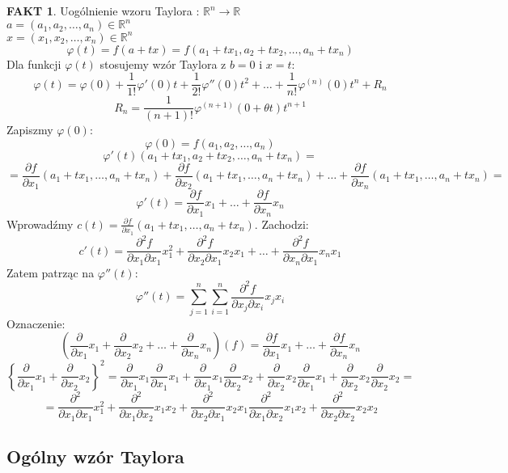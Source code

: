 \documentclass{article}
\theoremstyle{definition}
\theoremstyle{definition}
\theoremstyle{definition}
\theoremstyle{definition}
\theoremstyle{definition}
\theoremstyle{definition}
\theoremstyle{definition}
\newtheorem*{fakt}{FAKT}
\begin{document}
\begin{fakt}
Uogólnienie wzoru Taylora : $\mathbb{R}^n \rightarrow \mathbb{R}$\\
$a=(a_1,a_2,\dots,a_n)\in\mathbb{R}^n$\\ $x=(x_1,x_2,\dots, x_n)\in\mathbb{R}^n$
\[\varphi(t) = f(a+tx) = f(a_1+tx_1,a_2+tx_2,\dots,a_n+tx_n)\]
Dla funkcji $\varphi(t)$ stosujemy wzór Taylora z $b=0$ i $x=t$:
\[\varphi(t) = \varphi(0) + \frac{1}{1!} \varphi'(0)t + \frac{1}{2!} \varphi''(0)t^2 + \dots + \frac{1}{n!} \varphi^{(n)}(0) t^{n} + R_n\]
\[R_n = \frac{1}{(n+1)!} \varphi^{(n+1)} (0+\theta t) t^{n+1}\]
Zapiszmy $\varphi(0)$:
\[\varphi(0) = f(a_1,a_2,\dots, a_n)\]
\[\varphi'(t)(a_1+tx_1,a_2+tx_2,\dots,a_n+tx_n)=\]
\[=\frac{\partial f}{\partial x_1}(a_1+tx_1,\dots,a_n+tx_n) + \frac{\partial f}{\partial x_2}(a_1+tx_1,\dots,a_n+tx_n) + \dots + \frac{\partial f}{\partial x_n}(a_1+tx_1,\dots,a_n+tx_n)=\]
\[\varphi'(t) = \frac{\partial f}{\partial x_1} x_1 + \dots + \frac{\partial f}{\partial x_n} x_n\]
Wprowadźmy $c(t)=\frac{\partial f}{\partial x_1}(a_1+tx_1,\dots,a_n+tx_n)$. Zachodzi:
\[c'(t) = \frac{\partial^2 f}{\partial x_1 \partial x_1} x_1^2 + \frac{\partial^2 f}{\partial x_2 \partial x_1} x_2 x_1 + \dots + \frac{\partial^2 f}{\partial x_n \partial x_1} x_n x_1\]
Zatem patrząc na $\varphi''(t)$:
\[\varphi''(t)=\sum_{j=1}^{n}\sum_{i=1}^{n} \frac{\partial^2 f}{\partial x_j \partial x_i} x_j x_i\]
Oznaczenie:
\[\left(\frac{\partial}{\partial x_1} x_1 + \frac{\partial}{\partial x_2} x_2 + \dots + \frac{\partial}{\partial x_n} x_n\right) \left(f\right) = \frac{\partial f}{\partial x_1} x_1 + \dots + \frac{\partial f}{\partial x_n} x_n \]
\[\left\{\frac{\partial}{\partial x_1} x_1 + \frac{\partial}{\partial x_2} x_2\right\}^2 = \frac{\partial}{\partial x_1} x_1 \frac{\partial}{\partial x_1} x_1 + \frac{\partial}{\partial x_1} x_1 \frac{\partial}{\partial x_2} x_2 + \frac{\partial}{\partial x_2} x_2  \frac{\partial}{\partial x_1} x_1 + \frac{\partial}{\partial x_2} x_2 \frac{\partial}{\partial x_2} x_2=\]
\[=\frac{\partial^2}{\partial x_1 \partial x_1} x_1^2 + \frac{\partial^2}{\partial x_1 \partial x_2} x_1 x_2 + \frac{\partial^2}{\partial x_2 \partial x_1} x_2 x_1\frac{\partial^2}{\partial x_1 \partial x_2} x_1 x_2 + \frac{\partial^2}{\partial x_2 \partial x_2} x_2 x_2\]
\end{fakt}

\subsection{Ogólny wzór Taylora}
\end{document}

